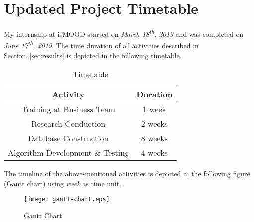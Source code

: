 \section{Updated Project Timetable}
\label{sec:timetable}

My internship at isMOOD started
on \emph{March 18\textsuperscript{th}, 2019}
and was completed 
on \emph{June 17\textsuperscript{th}, 2019}.
The time duration of all activities
described in Section~\ref{sec:results}
is depicted in the following timetable.

\begin{table}[ht]
\caption{\label{tab:timetable}Timetable}
\centering
\begin{tabular}{ |c|c| }
 \hline
 \textbf{Activity} & \textbf{Duration} \\ 
 \hline
 Training at Business Team & 1 week \\
 \hline
 Research Conduction & 2 weeks \\ 
 \hline
 Database Construction & 8 weeks \\ 
 \hline
 Algorithm Development \& Testing & 4 weeks \\
 \hline
\end{tabular}
\end{table}

The timeline of the above-mentioned activities
is depicted in the following figure (Gantt chart)
using \emph{week} as time unit.

\begin{figure}[ht]
\centering
\texttt{[image: gantt-chart.eps]}
\caption{Gantt Chart}
\label{fig:gantt-chart}
\end{figure}

% 
